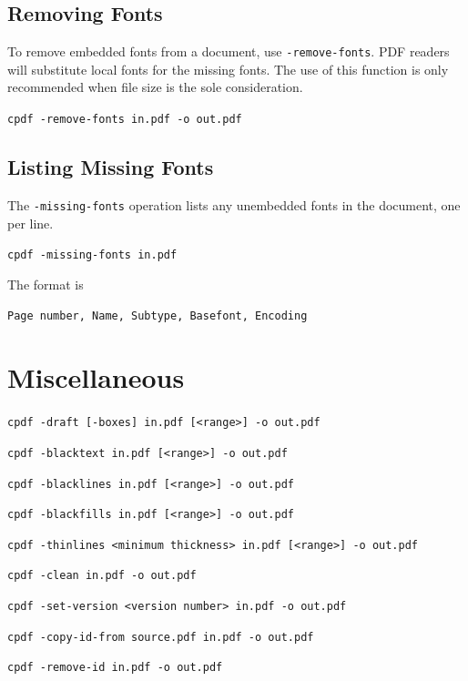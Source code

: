 \documentclass[a4paper,makeidx]{memoir}
\begin{document}
\section{Removing Fonts}
\label{removefont}

To remove embedded fonts from a document, use \verb!-remove-fonts!. PDF readers will
substitute local fonts for the missing fonts. The use of this function is only
recommended when file size is the sole consideration.

  \begin{framed}
  \small\noindent\verb!cpdf -remove-fonts in.pdf -o out.pdf!
  \vspace{2.5mm}
  \end{framed}

\section{Listing Missing Fonts}
  The \verb!-missing-fonts! operation lists any unembedded fonts in the document, one per line.
  \begin{framed}
  \small\noindent\verb!cpdf -missing-fonts in.pdf!
  \vspace{2.5mm}
  \end{framed}

  \noindent The format is
  \begin{framed}
  \small\noindent\verb!Page number, Name, Subtype, Basefont, Encoding!
  \vspace{2.5mm}
  \end{framed}

\label{listmisingfonts}

\chapter{Miscellaneous}
  \begin{framed}
  \noindent\verb!cpdf -draft [-boxes] in.pdf [<range>] -o out.pdf!

  \vspace{1.5mm}
  \noindent\verb!cpdf -blacktext in.pdf [<range>] -o out.pdf!

  \vspace{1.5mm}
  \noindent\verb!cpdf -blacklines in.pdf [<range>] -o out.pdf!

  \vspace{1.5mm}
  \noindent\verb!cpdf -blackfills in.pdf [<range>] -o out.pdf!

  \vspace{1.5mm}
  \noindent\verb!cpdf -thinlines <minimum thickness> in.pdf [<range>] -o out.pdf!

  \vspace{1.5mm}
  \noindent\verb!cpdf -clean in.pdf -o out.pdf!

  \vspace{1.5mm}
  \noindent\verb!cpdf -set-version <version number> in.pdf -o out.pdf!

  \vspace{1.5mm}
  \noindent\verb!cpdf -copy-id-from source.pdf in.pdf -o out.pdf!

  \vspace{1.5mm}
  \noindent\verb!cpdf -remove-id in.pdf -o out.pdf!

  \end{framed} 
\end{document}
